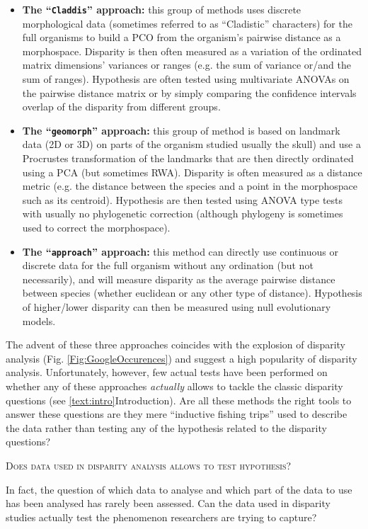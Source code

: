 \documentclass[12pt,letterpaper]{article}
\renewcommand{\section}[1]{%
\bigskip
\begin{center}
\begin{Large}
\normalfont\scshape #1
\medskip
\end{Large}
\end{center}}
\begin{document}
\begin{itemize}
    \item \textbf{The ``\texttt{Claddis}'' approach:} this group of methods uses discrete morphological data (sometimes referred to as ``Cladistic'' characters) for the full organisms to build a PCO from the organism's pairwise distance as a morphospace. Disparity is then often measured as a variation of the ordinated matrix dimensions' variances or ranges (e.g. the sum of variance or/and the sum of ranges). Hypothesis are often tested using multivariate ANOVAs on the pairwise distance matrix or by simply comparing the confidence intervals overlap of the disparity from different groups. 

    \item \textbf{The ``\texttt{geomorph}'' approach:} this group of method is based on landmark data (2D or 3D) on parts of the organism studied usually the skull) and use a Procrustes transformation of the landmarks that are then directly ordinated using a PCA (but sometimes RWA). Disparity is often measured as a distance metric (e.g. the distance between the species and a point in the morphospace such as its centroid). Hypothesis are then tested using ANOVA type tests with usually no phylogenetic correction (although phylogeny is sometimes used to correct the morphospace).

    \item \textbf{The ``\texttt{approach}'' approach:} this method can directly use continuous or discrete data for the full organism without any ordination (but not necessarily), and will measure disparity as the average pairwise distance between species (whether euclidean or any other type of distance). Hypothesis of higher/lower disparity can then be measured using null evolutionary models.
\end{itemize}

%
The advent of these three approaches coincides with the explosion of disparity analysis (Fig. \ref{Fig:GoogleOccurences}) and suggest a high popularity of disparity analysis.
%
Unfortunately, however, few actual tests have been performed on whether any of these approaches \textit{actually} allows to tackle the classic disparity questions (see \ref{text:intro}{Introduction}).
Are all these methods the right tools to answer these questions are they mere ``inductive fishing trips'' used to describe the data rather than testing any of the hypothesis related to the disparity questions?

\section{Does data used in disparity analysis allows to test hypothesis?}
In fact, the question of which data to analyse \citep{hetherington2015cladistic} and which part of the data to use has been analysed \citep{hopkins2017well} has rarely been assessed.
Can the data used in disparity studies actually test the phenomenon researchers are trying to capture?
\end{document}
